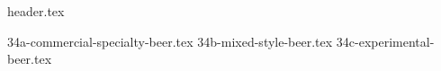 \clearpage
{}
\divisorLine
{header.tex}
\begin{multicols}{2}
{34a-commercial-specialty-beer.tex}
{34b-mixed-style-beer.tex}
{34c-experimental-beer.tex}
\end{multicols}